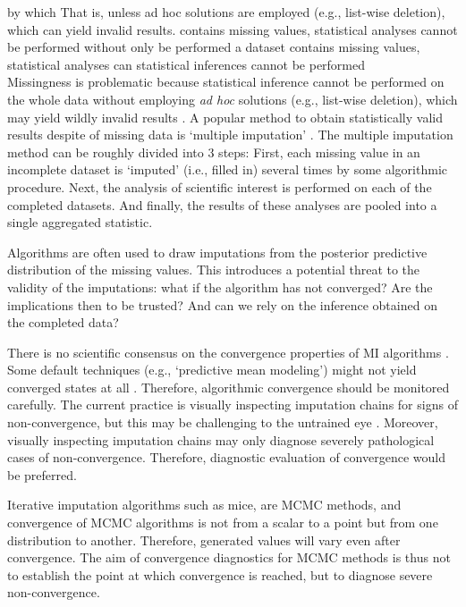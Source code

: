 \documentclass[Royal,times,sageh]{sagej}
\begin{document}
by which That is, unless ad hoc solutions are employed (e.g., list-wise
deletion), which can yield invalid results. contains missing values,
statistical analyses cannot be performed without only be performed a
dataset contains missing values, statistical analyses can statistical
inferences cannot be performed\\
Missingness is problematic because statistical inference cannot be
performed on the whole data without employing \emph{ad hoc} solutions
(e.g., list-wise deletion), which may yield wildly invalid results
\citep{buur18}. A popular method to obtain statistically valid results
despite of missing data is `multiple imputation' \citep[MI;][]{rubin76}.
The multiple imputation method can be roughly divided into 3 steps:
First, each missing value in an incomplete dataset is `imputed' (i.e.,
filled in) several times by some algorithmic procedure. Next, the
analysis of scientific interest is performed on each of the completed
datasets. And finally, the results of these analyses are pooled into a
single aggregated statistic.

Algorithms are often used to draw imputations from the posterior
predictive distribution of the missing values. This introduces a
potential threat to the validity of the imputations: what if the
algorithm has not converged? Are the implications then to be trusted?
And can we rely on the inference obtained on the completed data?

There is no scientific consensus on the convergence properties of MI
algorithms \citep{taka17}. Some default techniques (e.g., `predictive
mean modeling') might not yield converged states at all \citep{murr18}.
Therefore, algorithmic convergence should be monitored carefully. The
current practice is visually inspecting imputation chains for signs of
non-convergence, but this may be challenging to the untrained eye
\citep[\(\S\) 6.5.2]{buur18}. Moreover, visually inspecting imputation
chains may only diagnose severely pathological cases of non-convergence.
Therefore, diagnostic evaluation of convergence would be preferred.

Iterative imputation algorithms such as mice, are MCMC methods, and
convergence of MCMC algorithms is not from a scalar to a point but from
one distribution to another. Therefore, generated values will vary even
after convergence. The aim of convergence diagnostics for MCMC methods
is thus not to establish the point at which convergence is reached, but
to diagnose severe non-convergence.
\end{document}
